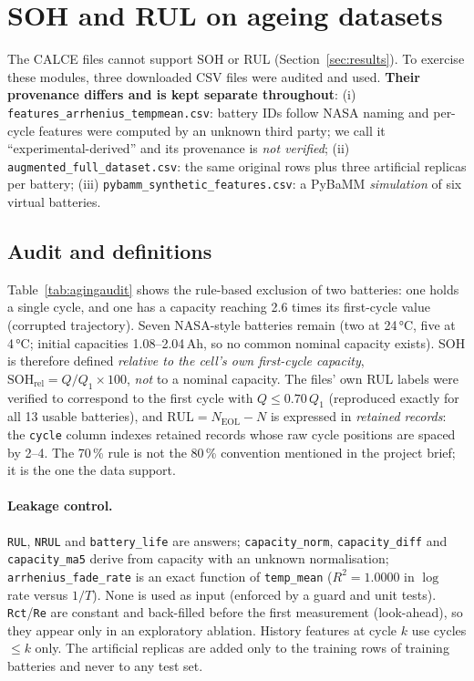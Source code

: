 \section{SOH and RUL on ageing datasets}
\label{sec:aging}
The CALCE files cannot support SOH or RUL (Section~\ref{sec:results}). To exercise these modules, three downloaded CSV files were audited and used. \textbf{Their provenance differs and is kept separate throughout}: (i) \texttt{features\_arrhenius\_tempmean.csv}: battery IDs follow NASA naming and per-cycle features were computed by an unknown third party; we call it ``experimental-derived'' and its provenance is \emph{not verified}; (ii) \texttt{augmented\_full\_dataset.csv}: the same original rows plus three artificial replicas per battery; (iii) \texttt{pybamm\_synthetic\_features.csv}: a PyBaMM \emph{simulation} of six virtual batteries.

\subsection{Audit and definitions}
Table~\ref{tab:agingaudit} shows the rule-based exclusion of two batteries: one holds a single cycle, and one has a capacity reaching 2.6 times its first-cycle value (corrupted trajectory). Seven NASA-style batteries remain (two at 24\,°C, five at 4\,°C; initial capacities 1.08--2.04\,Ah, so no common nominal capacity exists). SOH is therefore defined \emph{relative to the cell's own first-cycle capacity}, $\mathrm{SOH}_{\mathrm{rel}}=Q/Q_1\times100$, \emph{not} to a nominal capacity. The files' own RUL labels were verified to correspond to the first cycle with $Q\le0.70\,Q_1$ (reproduced exactly for all 13 usable batteries), and $\mathrm{RUL}=N_{\mathrm{EOL}}-N$ is expressed in \emph{retained records}: the \texttt{cycle} column indexes retained records whose raw cycle positions are spaced by 2--4. The 70\,\% rule is not the 80\,\% convention mentioned in the project brief; it is the one the data support.

\paragraph{Leakage control.} \texttt{RUL}, \texttt{NRUL} and \texttt{battery\_life} are answers; \texttt{capacity\_norm}, \texttt{capacity\_diff} and \texttt{capacity\_ma5} derive from capacity with an unknown normalisation; \texttt{arrhenius\_fade\_rate} is an exact function of \texttt{temp\_mean} ($R^2=1.0000$ in $\log$ rate versus $1/T$). None is used as input (enforced by a guard and unit tests). \texttt{Rct}/\texttt{Re} are constant and back-filled before the first measurement (look-ahead), so they appear only in an exploratory ablation. History features at cycle $k$ use cycles $\le k$ only. The artificial replicas are added only to the training rows of training batteries and never to any test set.

